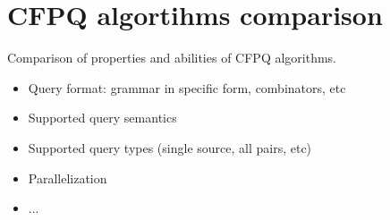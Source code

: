 \section{CFPQ algortihms comparison}

Comparison of properties and abilities of CFPQ algorithms.
\begin{itemize}
\item Query format: grammar in specific form, combinators, etc
\item Supported query semantics
\item Supported query types (single source, all pairs, etc)
\item Parallelization
\item ...
\end{itemize}
